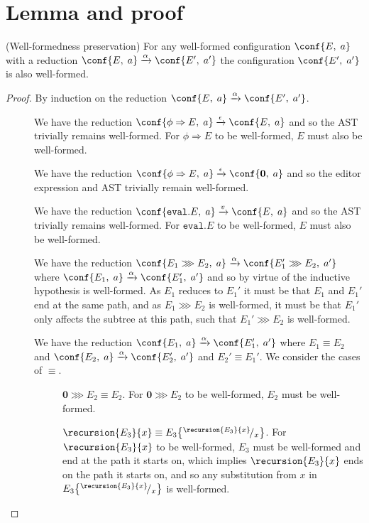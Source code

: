 \section{Lemma and proof}


\begin{lemma}{(Well-formedness preservation)} For any well-formed configuration $\conf{E,\; a}$ with a reduction $\conf{E,\; a} \xrightarrow{\alpha} \conf{E',\; a'}$ the configuration $\conf{E',\; a'}$ is also well-formed.

\begin{proof} By induction on the reduction $\conf{E,\; a} \xrightarrow{\alpha} \conf{E',\; a'}$.
%
\begin{description}
\item[] We have the reduction $\conf{\phi \Rightarrow E,\; a} \xrightarrow{\epsilon} \conf{E,\; a}$ and so the AST trivially remains well-formed. For $\phi \Rightarrow E$ to be well-formed, $E$ must also be well-formed.
%
\item[] We have the reduction $\conf{\phi \Rightarrow E,\; a} \xrightarrow{\epsilon} \conf{\mathbf{0},\; a}$ and so the editor expression and AST trivially remain well-formed. 
%
\item[] We have the reduction $\conf{\texttt{eval}.E,\; a} \xrightarrow{v} \conf{E,\; a}$ and so the AST trivially remains well-formed. For $\texttt{eval}.E$ to be well-formed, $E$ must also be well-formed.
%
\item[] We have the reduction $\conf{E_1 \ggg E_2,\; a} \xrightarrow{\alpha} \conf{E_1' \ggg E_2,\; a'}$ where $\conf{E_1,\; a} \xrightarrow{\alpha} \conf{E_1',\; a'}$ and so by virtue of the inductive hypothesis  is well-formed. As $E_1$ reduces to $E_1'$ it must be that $E_1$ and $E_1'$ end at the same path, and as $E_1 \ggg E_2$ is well-formed, it must be that $E_1'$ only affects the subtree at this path, such that $E_1' \ggg E_2$ is well-formed.
%
\item[] We have the reduction $\conf{E_1,\; a} \xrightarrow{\alpha} \conf{E_1',\; a'}$ where $E_1 \equiv E_2$ and $\conf{E_2,\; a} \xrightarrow{\alpha} \conf{E_2',\; a'}$ and $E_2' \equiv E_1'$. We consider the cases of $\equiv$.
%
\begin{description}
\item[] $\mathbf{0} \ggg E_2 \equiv E_2$. For $\mathbf{0} \ggg E_2$ to be well-formed, $E_2$ must be well-formed.
%
\item[] $\recursion{E_3}{x} \equiv E_3\!\left\{^{\recursion{E_3}{x}}\!/_x\right\}$. For $\recursion{E_3}{x}$ to be well-formed, $E_3$ must be well-formed and end at the path it starts on, which implies $\recursion{E_3}{x}$ ends on the path it starts on, and so any substitution from $x$ in $E_3\!\left\{^{\recursion{E_3}{x}}\!/_x\right\}$ is well-formed.

\end{description}
\end{description}
\end{proof}
\end{lemma}
